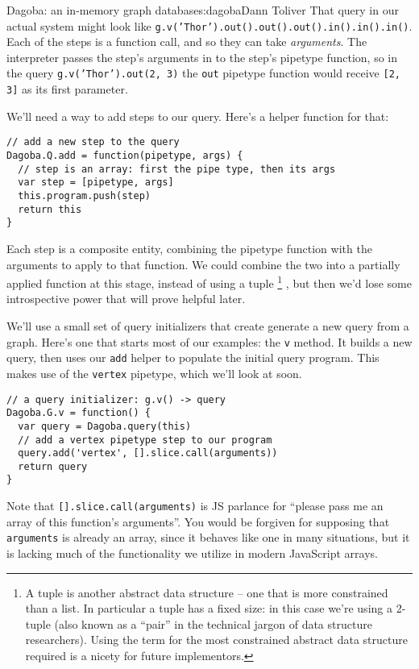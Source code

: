 \begin{aosachapter}{Dagoba: an in-memory graph database}{s:dagoba}{Dann Toliver}
That query in our actual system might look like
\texttt{g.v('Thor').out().out().out().in().in().in()}. Each of the steps
is a function call, and so they can take \emph{arguments}. The
interpreter passes the step's arguments in to the step's pipetype
function, so in the query \texttt{g.v('Thor').out(2, 3)} the
\texttt{out} pipetype function would receive \texttt{{[}2, 3{]}} as its
first parameter.

We'll need a way to add steps to our query. Here's a helper function for
that:

\begin{verbatim}
// add a new step to the query
Dagoba.Q.add = function(pipetype, args) {    
  // step is an array: first the pipe type, then its args
  var step = [pipetype, args]
  this.program.push(step)                    
  return this
}
\end{verbatim}

Each step is a composite entity, combining the pipetype function with
the arguments to apply to that function. We could combine the two into a
partially applied function at this stage, instead of using a tuple
\footnote{A tuple is another abstract data structure -- one that is more
  constrained than a list. In particular a tuple has a fixed size: in
  this case we're using a 2-tuple (also known as a ``pair'' in the
  technical jargon of data structure researchers). Using the term for
  the most constrained abstract data structure required is a nicety for
  future implementors.} , but then we'd lose some introspective power
that will prove helpful later.

We'll use a small set of query initializers that create generate a new
query from a graph. Here's one that starts most of our examples: the
\texttt{v} method. It builds a new query, then uses our \texttt{add}
helper to populate the initial query program. This makes use of the
\texttt{vertex} pipetype, which we'll look at soon.

\begin{verbatim}
// a query initializer: g.v() -> query
Dagoba.G.v = function() {                                         
  var query = Dagoba.query(this)
  // add a vertex pipetype step to our program
  query.add('vertex', [].slice.call(arguments))                   
  return query
}
\end{verbatim}

Note that \texttt{{[}{]}.slice.call(arguments)} is JS parlance for
``please pass me an array of this function's arguments''. You would be
forgiven for supposing that \texttt{arguments} is already an array,
since it behaves like one in many situations, but it is lacking much of
the functionality we utilize in modern JavaScript arrays.


\end{aosachapter}
